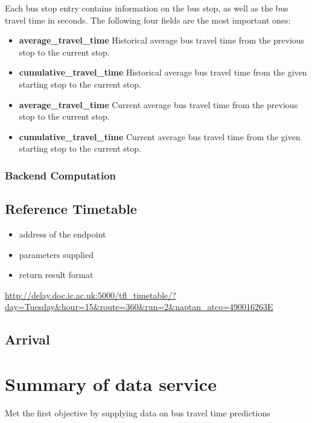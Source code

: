 \par Each bus stop entry contains information on the bus stop, as well as the bus travel time in seconds. The following four fields are the most important ones:

\begin{itemize}
  \item \textbf{average\_travel\_time} Historical average bus travel time from the previous stop to the current stop.
  \item \textbf{cumulative\_travel\_time} Historical average bus travel time from the given starting stop to the current stop.
  \item \textbf{average\_travel\_time} Current average bus travel time from the previous stop to the current stop.
  \item \textbf{cumulative\_travel\_time} Current average bus travel time from the given starting stop to the current stop.
\end{itemize}

\subsubsection{Backend Computation}

\subsection{Reference Timetable}
\begin{itemize}
  \item address of the endpoint
  \item parameters supplied
  \item return result format
\end{itemize}
\url{http://delay.doc.ic.ac.uk:5000/tfl_timetable/?day=Tuesday&hour=15&route=360&run=2&naptan_atco=490016263E}
\subsection{Arrival}

\section{Summary of data service}
Met the first objective by supplying data on bus travel time predictions
